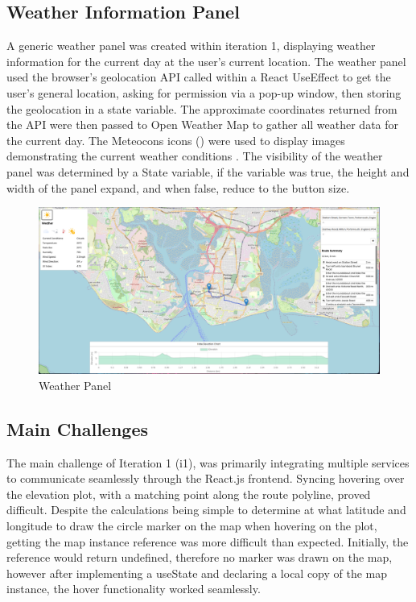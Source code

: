 \subsection{Weather Information Panel}
\label{iteration1:weather-panel}
A generic weather panel was created within iteration 1, displaying weather information for the current day at the user's current location. The weather panel used the browser's geolocation API called within a React UseEffect to get the user's general location, asking for permission via a pop-up window, then storing the geolocation in a state variable. The approximate coordinates returned from the API were then passed to Open Weather Map to gather all weather data for the current day. The Meteocons icons (\cite{noauthor_weather_nodate}) were used to display images demonstrating the current weather conditions . The visibility of the weather panel was determined by a State variable, if the variable was true, the height and width of the panel expand, and when false, reduce to the button size.

\begin{figure}[!ht]
    \centering
    \includegraphics[width=425px]{figures/Progress Images/Iteration-1/SR19&SR28 Combined/SR19&SR28 Merged.png}
    \caption{Weather Panel}
    \label{fig:basic-weather-panel}
\end{figure}

\subsection{Main Challenges}
\label{iteration1:main-challenges}
The main challenge of Iteration 1 (i1), was primarily integrating multiple services to communicate seamlessly through the React.js frontend. Syncing hovering over the elevation plot, with a matching point along the route polyline, proved difficult. Despite the calculations being simple to determine at what latitude and longitude to draw the circle marker on the map when hovering on the plot, getting the map instance reference was more difficult than expected. Initially, the reference would return undefined, therefore no marker was drawn on the map, however after implementing a useState and declaring a local copy of the map instance, the hover functionality worked seamlessly.

